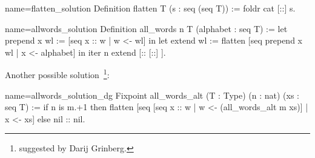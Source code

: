 
\begin{Answer}[ref=ex:flatten]

\begin{coq}{name=flatten_solution}{}
Definition flatten T (s : seq (seq T)) := foldr cat [::] s.
\end{coq}

\end{Answer}

\begin{Answer}[ref=ex:allwords]

\begin{coq}{name=allwords_solution}{}
Definition all_words n T (alphabet : seq T) :=
  let prepend x wl := [seq x :: w | w <- wl] in
  let extend wl := flatten [seq prepend x wl | x <- alphabet] in
  iter n extend [:: [::] ].
\end{coq}

Another possible solution~\footnote{suggested by Darij Grinberg.}:

\begin{coq}{name=allwords_solution_dg}{}
Fixpoint all_words_alt (T : Type) (n : nat) (xs : seq T) :=
  if n is m.+1 then
    flatten [seq [seq x :: w | w <- (all_words_alt m xs)] | x <- xs]
  else nil :: nil.
\end{coq}

\end{Answer}





